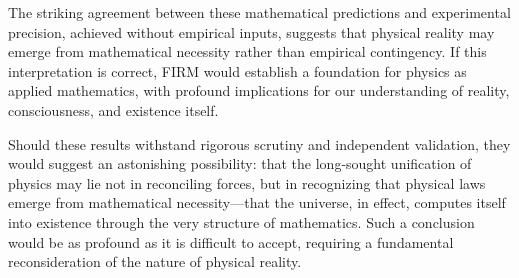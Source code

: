 \documentclass[12pt]{article}
\begin{document}
The striking agreement between these mathematical predictions and experimental precision, achieved without empirical inputs, suggests that physical reality may emerge from mathematical necessity rather than empirical contingency. If this interpretation is correct, FIRM would establish a foundation for physics as applied mathematics, with profound implications for our understanding of reality, consciousness, and existence itself.

Should these results withstand rigorous scrutiny and independent validation, they would suggest an astonishing possibility: that the long-sought unification of physics may lie not in reconciling forces, but in recognizing that physical laws emerge from mathematical necessity—that the universe, in effect, computes itself into existence through the very structure of mathematics. Such a conclusion would be as profound as it is difficult to accept, requiring a fundamental reconsideration of the nature of physical reality.


\label{sec:grace_operator}

\label{sec:dimensional_bridge}

\label{sec:spacetime_quantum_gravity}





















\end{document}
